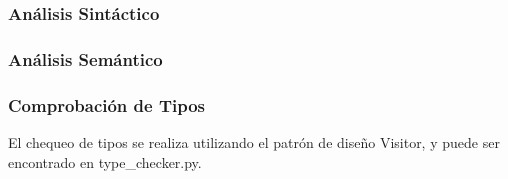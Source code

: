 \documentclass[10pt]{article} %
\begin{document}
	\subsubsection{An\'alisis Sint\'actico}
	
	\subsubsection{An\'alisis Sem\'antico}
	
	\subsubsection{Comprobaci\'on de Tipos}
	
	El chequeo de tipos se realiza utilizando el patrón de diseño Visitor, y puede ser encontrado en type\_checker.py.
	
\end{document}
